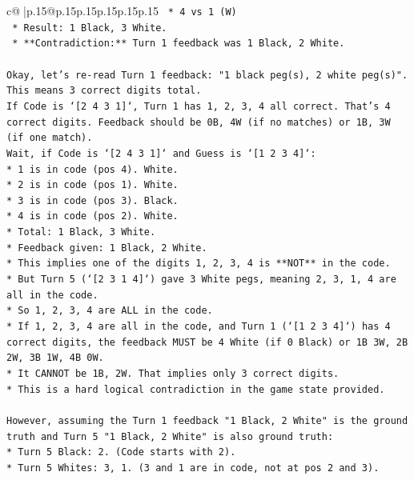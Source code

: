 \documentclass{article}
\begin{document}
{\begin{supertabular}{c@{$\;$}|p{.15\linewidth}@{}p{.15\linewidth}p{.15\linewidth}p{.15\linewidth}p{.15\linewidth}p{.15\linewidth}}
{{{\texttt{    *   4 vs 1 (W)} \\
\texttt{    *   Result: 1 Black, 3 White.} \\
\texttt{    *   **Contradiction:** Turn 1 feedback was 1 Black, 2 White.} \\
\\ 
\texttt{Okay, let's re{-}read Turn 1 feedback: "1 black peg(s), 2 white peg(s)".} \\
\texttt{This means 3 correct digits total.} \\
\texttt{If Code is `{[}2 4 3 1{]}`, Turn 1 has 1, 2, 3, 4 all correct. That's 4 correct digits. Feedback should be 0B, 4W (if no matches) or 1B, 3W (if one match).} \\
\texttt{Wait, if Code is `{[}2 4 3 1{]}` and Guess is `{[}1 2 3 4{]}`:} \\
\texttt{*   1 is in code (pos 4). White.} \\
\texttt{*   2 is in code (pos 1). White.} \\
\texttt{*   3 is in code (pos 3). Black.} \\
\texttt{*   4 is in code (pos 2). White.} \\
\texttt{*   Total: 1 Black, 3 White.} \\
\texttt{*   Feedback given: 1 Black, 2 White.} \\
\texttt{*   This implies one of the digits 1, 2, 3, 4 is **NOT** in the code.} \\
\texttt{*   But Turn 5 (`{[}2 3 1 4{]}`) gave 3 White pegs, meaning 2, 3, 1, 4 are all in the code.} \\
\texttt{*   So 1, 2, 3, 4 are ALL in the code.} \\
\texttt{*   If 1, 2, 3, 4 are all in the code, and Turn 1 (`{[}1 2 3 4{]}`) has 4 correct digits, the feedback MUST be 4 White (if 0 Black) or 1B 3W, 2B 2W, 3B 1W, 4B 0W.} \\
\texttt{*   It CANNOT be 1B, 2W. That implies only 3 correct digits.} \\
\texttt{*   This is a hard logical contradiction in the game state provided.} \\
\\ 
\texttt{However, assuming the Turn 1 feedback "1 Black, 2 White" is the ground truth and Turn 5 "1 Black, 2 White" is also ground truth:} \\
\texttt{*   Turn 5 Black: 2. (Code starts with 2).} \\
\texttt{*   Turn 5 Whites: 3, 1. (3 and 1 are in code, not at pos 2 and 3).} \\
}}}
\end{supertabular}}
\end{document}
